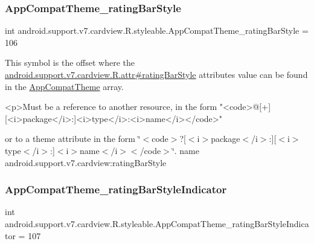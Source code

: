 \subsubsection{\texorpdfstring{App\+Compat\+Theme\+\_\+rating\+Bar\+Style}{AppCompatTheme\_ratingBarStyle}}
{\footnotesize\ttfamily int android.\+support.\+v7.\+cardview.\+R.\+styleable.\+App\+Compat\+Theme\+\_\+rating\+Bar\+Style = 106\hspace{0.3cm}{\ttfamily [static]}}

This symbol is the offset where the \hyperlink{classandroid_1_1support_1_1v7_1_1cardview_1_1R_1_1attr_a77d242b065131572dca159bfb4618c36}{android.\+support.\+v7.\+cardview.\+R.\+attr\#rating\+Bar\+Style} attribute\textquotesingle{}s value can be found in the \hyperlink{classandroid_1_1support_1_1v7_1_1cardview_1_1R_1_1styleable_a52e6f69f954ecc2622d72c0b4d298938}{App\+Compat\+Theme} array.

\begin{DoxyVerb}      <p>Must be a reference to another resource, in the form "<code>@[+][<i>package</i>:]<i>type</i>:<i>name</i></code>"
\end{DoxyVerb}
 or to a theme attribute in the form \char`\"{}$<$code$>$?\mbox{[}$<$i$>$package$<$/i$>$\+:\mbox{]}\mbox{[}$<$i$>$type$<$/i$>$\+:\mbox{]}$<$i$>$name$<$/i$>$$<$/code$>$\char`\"{}.  name android.\+support.\+v7.\+cardview\+:rating\+Bar\+Style \mbox{\label{classandroid_1_1support_1_1v7_1_1cardview_1_1R_1_1styleable_a3224ccfc3225c5afe3441f7efca1270c}} 
\subsubsection{\texorpdfstring{App\+Compat\+Theme\+\_\+rating\+Bar\+Style\+Indicator}{AppCompatTheme\_ratingBarStyleIndicator}}
{\footnotesize\ttfamily int android.\+support.\+v7.\+cardview.\+R.\+styleable.\+App\+Compat\+Theme\+\_\+rating\+Bar\+Style\+Indicator = 107\hspace{0.3cm}{\ttfamily [static]}}

